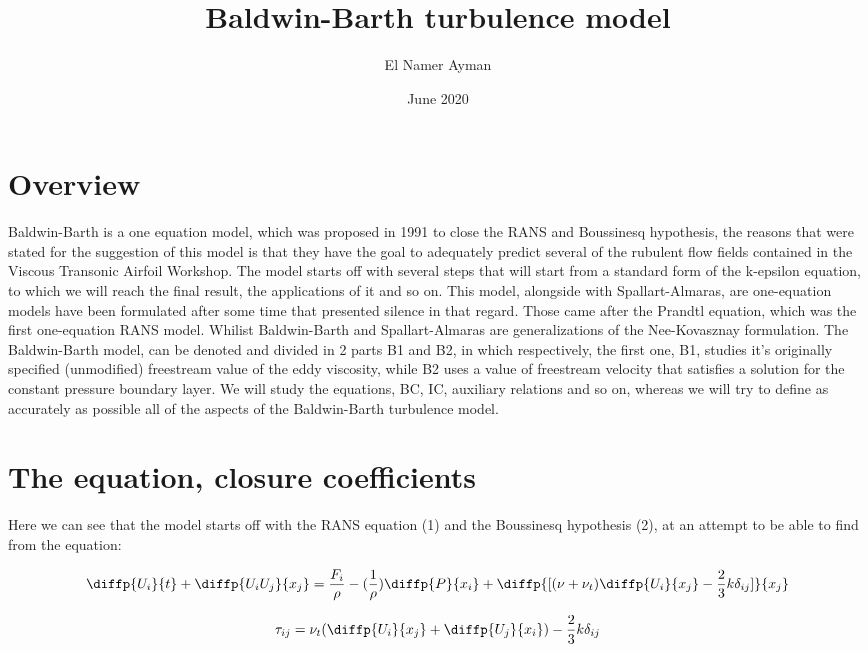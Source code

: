 \documentclass{article}
\title{Baldwin-Barth turbulence model}
\author{El Namer Ayman }
\date{June 2020}
\begin{document}
\maketitle

\section{Overview}
Baldwin-Barth is a one equation model, which was proposed in 1991 to close the RANS and Boussinesq hypothesis, the reasons that were stated for the suggestion of this model is that they have the goal to adequately predict several of the rubulent flow fields contained in the Viscous Transonic Airfoil Workshop. 
The model starts off with several steps that will start from a standard form of the k-epsilon equation, to which we will reach the final result, the applications of it and so on. This model, alongside with Spallart-Almaras, are one-equation models have been formulated after some time that presented silence in that regard. Those came after the Prandtl equation, which was the first one-equation RANS model. Whilist Baldwin-Barth and Spallart-Almaras are generalizations of the Nee-Kovasznay formulation.
The Baldwin-Barth model, can be denoted and divided in 2 parts B1 and B2, in which respectively, the first one, B1, studies it's originally specified (unmodified) freestream value of the eddy viscosity, while B2 uses a value of freestream velocity that satisfies a solution for the constant pressure boundary layer.
We will study the equations, BC, IC, auxiliary relations and so on, whereas we will try to define as accurately as possible all of the aspects of the Baldwin-Barth turbulence model.

\section{The equation, closure coefficients}

Here we can see that the model starts off with the RANS equation (1) and the Boussinesq hypothesis (2), at an attempt to be able to find from the equation: 

\begin{equation}
    \diffp{U_i}{t}+\diffp{U_iU_j}{{x_j}}=\frac{F_i}{\rho}-(\frac{1}{\rho})\diffp{P}{{x_i}}+\diffp{[(\nu+\nu_t)\diffp{U_i}{{x_j}}-\frac{2}{3}k\delta_{ij}]}{{x_j}}
\end{equation}

\begin{equation}
\tau_{ij}=\nu_t(\diffp{U_i}{{x_j}}+\diffp{U_j}{{x_i}})-\frac{2}{3}k\delta_{ij}
\end{equation}
\end{document}
